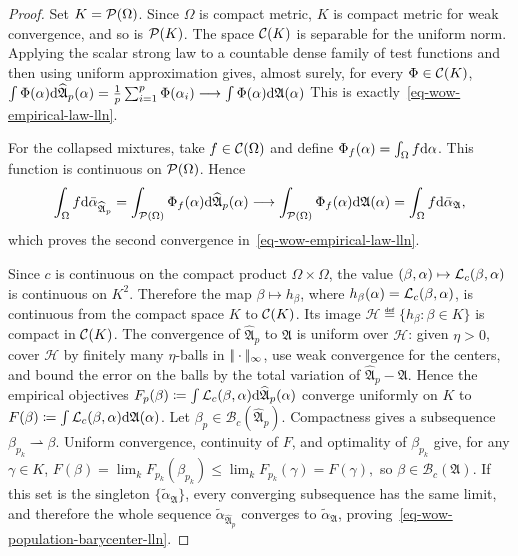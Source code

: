 \begin{proof}
Set $K=\mathcal{P}(\Omega)$. Since $\Omega$ is compact metric, $K$ is compact metric for weak convergence, and so is $\mathcal{P}(K)$. The space $\mathcal{C}(K)$ is separable for the uniform norm. Applying the scalar strong law to a countable dense family of test functions and then using uniform approximation gives, almost surely, for every $\Phi\in\mathcal{C}(K)$,
\(\int \Phi(\alpha)\mathrm{d}\widehat{\mathfrak A}_p(\alpha) = \frac1p\sum_{i=1}^p\Phi(\alpha_i) \longrightarrow \int \Phi(\alpha)\mathrm{d}\mathfrak A(\alpha)\)
This is exactly~\eqref{eq-wow-empirical-law-lln}.

For the collapsed mixtures, take $f\in\mathcal{C}(\Omega)$ and define $\Phi_f(\alpha)=\int_\Omega f\mathrm{d}\alpha$. This function is continuous on $\mathcal{P}(\Omega)$. Hence
\[
\int_\Omega f\mathrm{d}\bar\alpha_{\widehat{\mathfrak A}_p}
=
\int_{\mathcal{P}(\Omega)}\Phi_f(\alpha)\mathrm{d}\widehat{\mathfrak A}_p(\alpha)
\longrightarrow
\int_{\mathcal{P}(\Omega)}\Phi_f(\alpha)\mathrm{d}\mathfrak A(\alpha)
=
\int_\Omega f\mathrm{d}\bar\alpha_{\mathfrak A},
\]
which proves the second convergence in~\eqref{eq-wow-empirical-law-lln}.

Since $c$ is continuous on the compact product $\Omega\times\Omega$, the value $(\beta,\alpha)\mapsto\mathcal{L}_c(\beta,\alpha)$ is continuous on $K^2$. Therefore the map $\beta\mapsto h_\beta$, where $h_\beta(\alpha)=\mathcal{L}_c(\beta,\alpha)$, is continuous from the compact space $K$ to $\mathcal{C}(K)$. Its image
\(\mathcal H \eqdef \{h_\beta:\beta\in K\}\)
is compact in $\mathcal{C}(K)$. The convergence of $\widehat{\mathfrak A}_p$ to $\mathfrak A$ is uniform over $\mathcal H$: given $\eta>0$, cover $\mathcal H$ by finitely many $\eta$-balls in $|\!| \cdot |\!|_\infty$, use weak convergence for the centers, and bound the error on the balls by the total variation of $\widehat{\mathfrak A}_p-\mathfrak A$. Hence the empirical objectives
$F_p(\beta)\coloneqq\int\mathcal{L}_c(\beta,\alpha)\mathrm{d}\widehat{\mathfrak A}_p(\alpha)$
converge uniformly on $K$ to
$F(\beta)\coloneqq\int\mathcal{L}_c(\beta,\alpha)\mathrm{d}\mathfrak A(\alpha)$.
Let $\beta_p\in\mathcal B_c(\widehat{\mathfrak A}_p)$. Compactness gives a subsequence $\beta_{p_k}\rightharpoonup\beta$. Uniform convergence, continuity of $F$, and optimality of $\beta_{p_k}$ give, for any $\gamma\in K$,
\(F(\beta) = \lim_k F_{p_k}(\beta_{p_k}) \leq \lim_k F_{p_k}(\gamma) = F(\gamma),\)
so $\beta\in\mathcal B_c(\mathfrak A)$. If this set is the singleton $\{\widetilde\alpha_{\mathfrak A}\}$, every converging subsequence has the same limit, and therefore the whole sequence $\widetilde\alpha_{\widehat{\mathfrak A}_p}$ converges to $\widetilde\alpha_{\mathfrak A}$, proving~\eqref{eq-wow-population-barycenter-lln}.
\end{proof}
